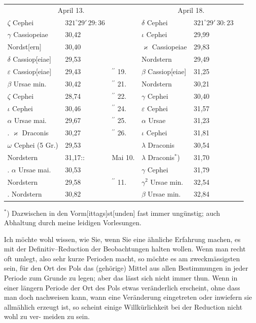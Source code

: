 \documentclass[12pt,a4paper]{article}
\theoremstyle{plain}
\theoremstyle{definition}
\theoremstyle{remark}
\begin{document}
\begin{center}
\begin{tabular}{l l l | l l l}
\toprule
\multicolumn{3}{c|}{April 13.} & \multicolumn{3}{c}{April 18.} \\
$\zeta$ Cephei & $321^\circ 29'\,29\!\!:\!\!36$ & & $\delta$ Cephei & $321^\circ 29'\,30\!\!:\!\!23$ \\
$\gamma$ Cassiopeiae & 30,42 & & $\iota$ Cephei & 29,99 \\
Nordst[ern] & 30,40 & & $\varkappa$ Cassiopeiae & 29,83 \\
$\delta$ Cassiop[eiae] & 29,53 & & Nordstern & 29,49 \\
$\varepsilon$ Cassiop[eiae] & 29,43 & $^{\prime\prime}$ 19. & $\beta$ Cassiop[eiae] & 31,25 \\
$\beta$ Ursae min. & 30,42 & $^{\prime\prime}$ 21. & Nordstern & 30,21 \\
$\zeta$ Cephei & 28,74 & $^{\prime\prime}$ 22. & $\gamma$ Cephei & 30,40 \\
$\iota$ Cephei & 30,46 & $^{\prime\prime}$ 24. & $\varepsilon$ Cephei & 31,57 \\
$\alpha$ Ursae mai. & 29,67 & $^{\prime\prime}$ 25. & $\alpha$ Ursae & 31,23 \\
\quad 15. $\varkappa$ Draconis & 30,27 & $^{\prime\prime}$ 26. & $\iota$ Cephei & 31,81 \\
\quad\quad $\omega$ Cephei (5 Gr.) & 29,53 & & $\lambda$ Draconis & 30,54 \\
\quad\quad Nordstern & 31,17:: & Mai 10. & $\lambda$ Draconis$^*$) & 31,70 \\
\quad 17. $\alpha$ Ursae mai. & 30,53 & & $\gamma$ Cephei & 31,79 \\
\quad\quad Nordstern & 29,58 & $^{\prime\prime}$ 11. & $\gamma^2$ Ursae min. & 32,54 \\
\quad 18. Nordstern & 30,82 & & $\beta$ Ursae min. & 32,84 \\
\bottomrule
\end{tabular}
\end{center}

\smallskip
$^*$) Dazwischen in den Vorm[ittags]st[unden] fast immer ung\"{u}nstig; auch Abhaltung durch meine leidigen
Vorlesungen.

Ich m\"{o}chte wohl wissen, wie Sie, wenn Sie eine \"{a}hnliche Erfahrung
machen, es mit der Definitiv--Reduction der Beobachtungen halten wollen.
Wenn man recht oft umlegt, also sehr kurze Perioden macht, so m\"{o}chte es
am zweckm\"{a}ssigsten sein, f\"{u}r den Ort des Pols das (geh\"{o}rige) Mittel aus
allen Bestimmungen in jeder Periode zum Grunde zu legen; aber das l\"{a}sst
sich nicht immer thun. Wenn in einer l\"{a}ngern Periode der Ort des Pols
etwas ver\"{a}nderlich erscheint, ohne dass man doch nachweisen kann, wann
eine Ver\"{a}nderung eingetreten oder inwiefern sie allm\"{a}hlich erzeugt ist, so
scheint einige Willk\"{u}rlichkeit bei der Reduction nicht wohl zu ver-
meiden zu sein. \dotfill
\end{document}
